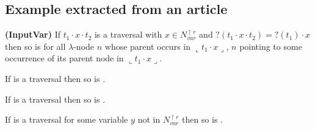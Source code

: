 \subsection{Example extracted from an article}
\newcommand{\oview}[1]{\llcorner #1 \lrcorner}
{\bf (InputVar)} If $t_1 \cdot x \cdot t_2$ is a traversal with
  $x \in N_{var}^{\upharpoonright r}$ and $?(t_1 \cdot x \cdot
  t_2)=?(t_1) \cdot x$ then so is  for all
  $\lambda$-node $n$ whose parent occurs in $\oview{t_1 \cdot x}$, $n$
  pointing to some occurrence of its parent node in $\oview{t_1 \cdot x}$.

  If  is a traversal then so is
.

 If 
is a traversal then so is .

If  is a traversal
for some variable $y$ not in $N_{var}^{\upharpoonright r}$ then so
is .

